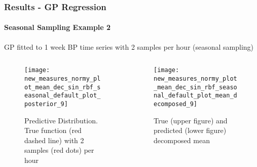 \documentclass[
	8pt, %
]{beamer}
\begin{document}
\begin{frame}
	\frametitle{Results - GP Regression}
	\framesubtitle{Seasonal Sampling Example  2}

	GP fitted to 1 week BP time series with 2 samples per hour (seasonal sampling)

		\begin{columns}[c] %
		\begin{column}{0.5\textwidth} %
				\begin{figure}
					\texttt{[image: new\_measures\_normy\_plot\_mean\_dec\_sin\_rbf\_seasonal\_default\_plot\_posterior\_9]}
					\caption{Predictive Distribution. True function (red dashed line) with 2 samples (red dots) per hour}
				\end{figure}
		\end{column}
		\begin{column}{0.5\textwidth} %
				\begin{figure}
					\texttt{[image: new\_measures\_normy\_plot\_mean\_dec\_sin\_rbf\_seasonal\_default\_plot\_mean\_decomposed\_9]}
					\caption{True (upper figure) and predicted (lower figure) decomposed mean}
				\end{figure}

		\end{column}
	\end{columns}

\end{frame}
\end{document}
